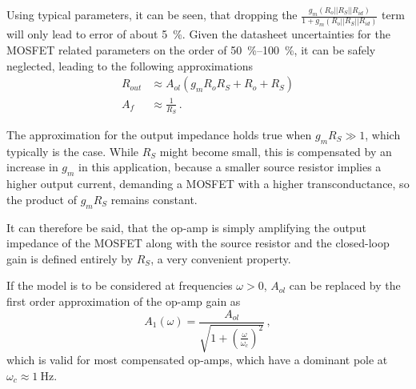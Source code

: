 \documentclass[12pt]{book}
\begin{document}
Using typical parameters, it can be seen, that dropping the $\frac{g_m \left(R_o || R_S || R_{id}\right)}{1 + g_m \left(R_o || R_S || R_{id}\right)}$ term will only lead to error of about \qty{5}{\percent}. Given the datasheet uncertainties for the MOSFET related parameters on the order of \qtyrange{50}{100}{\percent}, it can be safely neglected, leading to the following approximations
\begin{align}
    R_{out} &\approx A_{ol} \left(g_m R_o R_S + R_o + R_S \right)\\
    A_f &\approx \frac{1}{R_S} \,. \nonumber
\end{align}

The approximation for the output impedance holds true when $g_m R_S \gg 1$, which typically is the case. While $R_S$ might become small, this is compensated by an increase in $g_m$ in this application, because a smaller source resistor implies a higher output current, demanding a MOSFET with a higher transconductance, so the product of $g_m R_S$ remains constant.

It can therefore be said, that the op-amp is simply amplifying the output impedance of the MOSFET along with the source resistor and the closed-loop gain is defined entirely by $R_S$, a very convenient property.

If the model is to be considered at frequencies $\omega > 0$, $A_{ol}$ can be replaced by the first order approximation of the op-amp gain as
\begin{equation}
    A_1 (\omega) = \frac{A_{ol}}{\sqrt{1 + \left(\frac{\omega}{\omega_c}\right)^2}}\,,\label{eqn:op-amp_gain}
\end{equation}
which is valid for most compensated op-amps, which have a dominant pole at $\omega_c \approx \qty{1}{\Hz}$.
\end{document}
